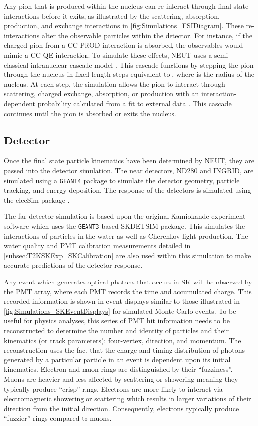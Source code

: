 Any pion that is produced within the nucleus can re-interact through final state interactions before it exits, as illustrated by the scattering, absorption, production, and exchange interactions in \autoref{fig:Simulations_FSIDiagram}. These re-interactions alter the observable particles within the detector. For instance, if the charged pion from a CC PROD interaction is absorbed, the observables would mimic a CC QE interaction. To simulate these effects, NEUT uses a semi-classical intranuclear cascade model \cite{Hayato2021}. This cascade functions by stepping the pion through the nucleus in fixed-length steps equivalent to , where  is the radius of the nucleus. At each step, the simulation allows the pion to interact through scattering, charged exchange, absorption, or production with an interaction-dependent probability calculated from a fit to external data \cite{PhysRevD.99.052007}. This cascade continues until the pion is absorbed or exits the nucleus.

\subsection{Detector}

Once the final state particle kinematics have been determined by NEUT, they are passed into the detector simulation. The near detectors, ND280 and INGRID, are simulated using a \texttt{GEANT4} package \cite{t2k_det,geant4} to simulate the detector geometry, particle tracking, and energy deposition. The response of the detectors is simulated using the elecSim package \cite{t2k_det}.

The far detector simulation is based upon the original Kamiokande experiment software which uses the \texttt{GEANT3}-based SKDETSIM \cite{Brun:1987ma,t2k_det} package. This simulates the interactions of particles in the water as well as Cherenkov light production. The water quality and PMT calibration measurements detailed in \autoref{subsec:T2KSKExp_SKCalibration} are also used within this simulation to make accurate predictions of the detector response.

Any event which generates optical photons that occurs in SK will be observed by the PMT array, where each PMT records the time and accumulated charge. This recorded information is shown in event displays similar to those illustrated in \autoref{fig:Simulations_SKEventDisplays} for simulated Monte Carlo events. To be useful for physics analyses, this series of PMT hit information needs to be reconstructed to determine the number and identity of particles and their kinematics (or track parameters): four-vertex, direction, and momentum. The reconstruction uses the fact that the charge and timing distribution of photons generated by a particular particle in an event is dependent upon its initial kinematics. Electron and muon rings are distinguished by their ``fuzziness''. Muons are heavier and less affected by scattering or showering meaning they typically produce ``crisp'' rings. Electrons are more likely to interact via electromagnetic showering or scattering which results in larger variations of their direction from the initial direction. Consequently, electrons typically produce ``fuzzier'' rings compared to muons. 

